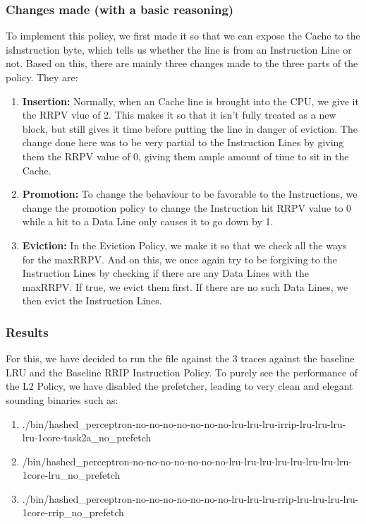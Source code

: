 \documentclass[11pt,a4paper]{article}
\begin{document}
\subsubsection{Changes made (with a basic reasoning)}
To implement this policy, we first made it so that we can expose the Cache to the isInstruction byte, which tells us whether the line is from an Instruction Line or not. Based on this, there are mainly three changes made to the three parts of the policy. They are:
\begin{enumerate}
\item \textbf{Insertion: } Normally, when an Cache line is brought into the CPU, we give it the RRPV vlue of 2. This makes it so that it isn't fully treated as a new block, but still gives it time before putting the line in danger of eviction. The change done here was to be very partial to the Instruction Lines by giving them the RRPV value of 0, giving them ample amount of time to sit in the Cache.
\item \textbf{Promotion: } To change the behaviour to be favorable to the Instructions, we change the promotion policy to change the Instruction hit RRPV value to 0 while a hit to a Data Line only causes it to go down by 1.
\item \textbf{Eviction: } In the Eviction Policy, we make it so that we check all the ways for the maxRRPV. And on this, we once again try to be forgiving to the Instruction Lines by checking if there are any Data Lines with the maxRRPV. If true, we evict them first. If there are no such Data Lines, we then evict the Instruction Lines.
\end{enumerate}

\subsubsection{Results}
For this, we have decided to run the file against the 3 traces against the baseline LRU and the Baseline RRIP Instruction Policy. To purely see the performance of the L2 Policy, we have disabled the prefetcher, leading to very clean and elegant sounding binaries such as:
\begin{enumerate}
\item ./bin/hashed\_perceptron-no-no-no-no-no-no-no-lru-lru-lru-irrip-lru-lru-lru-lru-1core-task2a\_no\_prefetch
\item /bin/hashed\_perceptron-no-no-no-no-no-no-no-lru-lru-lru-lru-lru-lru-lru-lru-1core-lru\_no\_prefetch
\item ./bin/hashed\_perceptron-no-no-no-no-no-no-no-lru-lru-lru-rrip-lru-lru-lru-lru-1core-rrip\_no\_prefetch

\end{enumerate}
\end{document}
